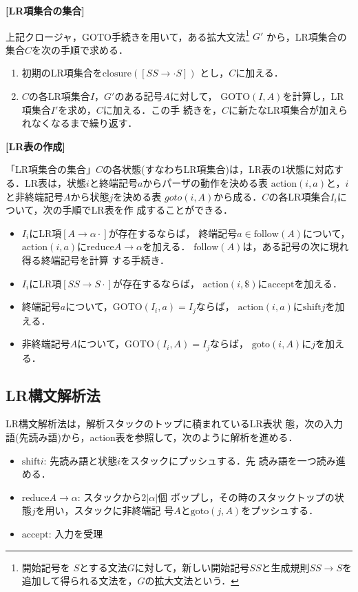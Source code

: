 {\flushleft \bf [LR項集合の集合]}

上記クロージャ，GOTO手続きを用いて，ある拡大文法\footnote {開始記号を
  $S$とする文法$G$に対して，新しい開始記号$SS$と生成規則$SS
  \rightarrow S$を追加して得られる文法を，$G$の拡大文法という．} $G'$
から，LR項集合の集合$C$を次の手順で求める．
\begin{enumerate}
\item 初期のLR項集合を$\mbox{closure}({[SS \rightarrow \cdot S ]})$
  とし，$C$に加える．
  
\item $C$の各LR項集合$I$，$G'$のある記号$A$に対して，
  $\mbox{GOTO}(I,A)$を計算し，LR項集合$I'$を求め，$C$に加える．この手
  続きを，$C$に新たなLR項集合が加えられなくなるまで繰り返す．
\end{enumerate}

{\flushleft \bf [LR表の作成]}

「LR項集合の集合」$C$の各状態(すなわちLR項集合)は，LR表の1状態に対応す
る．LR表は，状態$i$と終端記号$a$からパーザの動作を決める表
$\mbox{action}(i,a)$と，$i$と非終端記号$A$から状態$j$を決める表
$goto(i,A)$から成る．$C$の各LR項集合$I_i$について，次の手順でLR表を作
成することができる．
\begin{itemize}
\item $I_i$にLR項$[A \rightarrow \alpha \cdot ]$が存在するならば，
  終端記号$a \in \mbox{follow}(A)$について，
  $\mbox{action}(i,a)$に$\mbox{reduce} A \rightarrow \alpha$を加える．
  $\mbox{follow}(A)$は，ある記号の次に現れ得る終端記号を計算
  する手続き．

\item $I_i$にLR項$[SS \rightarrow S \cdot ]$が存在するならば，
  $\mbox{action}(i,\$)$に$\mbox{accept}$を加える．
    
\item 終端記号$a$について，$\mbox{GOTO}(I_i, a) = I_j$ならば，
  $\mbox{action}(i,a)$に$\mbox{shift} j$を加える．
  
\item 非終端記号$A$について，$\mbox{GOTO}(I_i, A) = I_j$ならば，
  $\mbox{goto}(i,A)$に$j$を加える．
\end{itemize}

\subsection*{LR構文解析法}

LR構文解析法は，解析スタックのトップに積まれているLR表状
態，次の入力語(先読み語)から，action表を参照して，次のように解析を進める．
\begin{itemize}
\item $\mbox{shift} i$: 先読み語と状態$i$をスタックにプッシュする．先
  読み語を一つ読み進める．

\item $\mbox{reduce} A \rightarrow \alpha$: スタックから$2|\alpha|$個
  ポップし，その時のスタックトップの状態$j$を用い，スタックに非終端記
  号$A$と$\mbox{goto}(j,A)$をプッシュする．

\item $\mbox{accept}$: 入力を受理
\end{itemize}


